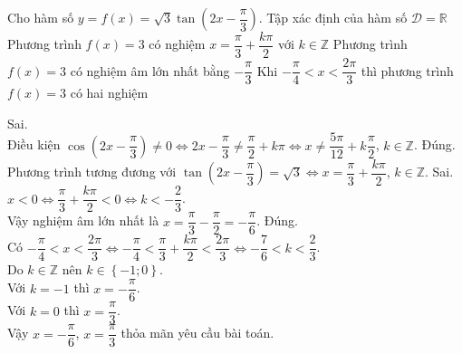 \begin{ex}%
	Cho hàm số $y=f(x)=\sqrt{3} \tan \left(2x-\dfrac{\pi}{3} \right)$.
	\choiceTF
	{Tập xác định của hàm số $\mathscr{D}=\mathbb{R}$}
	{\True Phương trình $f(x)=3$ có nghiệm $x=\dfrac{\pi}{3} + \dfrac{k\pi}{2}$ với $k \in \mathbb{Z}$}
	{Phương trình $f(x)=3$ có nghiệm âm lớn nhất bằng $-\dfrac{\pi}{3}$}
	{\True Khi $-\dfrac{\pi}{4} <x< \dfrac{2\pi}{3}$ thì phương trình $f(x)=3$ có hai nghiệm}
	\loigiai
	{
		\begin{itemchoice}
			\itemch Sai. \\
			Điều kiện
			$\cos \left(2x-\dfrac{\pi}{3} \right) \ne 0 \Leftrightarrow 2x-\dfrac{\pi}{3} \ne \dfrac{\pi}{2} + k\pi \Leftrightarrow x \ne \dfrac{5\pi}{12} + k\dfrac{\pi}{2}$, $k \in \mathbb{Z}$.
			\itemch Đúng. \\
			Phương trình tương đương với $\tan \left(2x-\dfrac{\pi}{3} \right) = \sqrt{3} \Leftrightarrow x=\dfrac{\pi}{3} + \dfrac{k\pi}{2}$, $k \in \mathbb{Z}$.
			\itemch Sai.\\
			$x <0 \Leftrightarrow \dfrac{\pi}{3} + \dfrac{k\pi}{2} <0 \Leftrightarrow k<-\dfrac{2}{3}$. \\
			Vậy nghiệm âm lớn nhất là $x=\dfrac{\pi}{3}-\dfrac{\pi}{2}=-\dfrac{\pi}{6}$.
			\itemch Đúng. \\
			Có  $-\dfrac{\pi}{4} <x< \dfrac{2\pi}{3} 
			\Leftrightarrow -\dfrac{\pi}{4} < \dfrac{\pi}{3} + \dfrac{k\pi}{2} < \dfrac{2\pi}{3}
			\Leftrightarrow -\dfrac{7}{6} <k< \dfrac{2}{3}$.\\
			Do $k \in \mathbb{Z}$ nên $k \in \left\{-1; 0 \right\}$.\\
			Với $k=-1$ thì $x=-\dfrac{\pi}{6}$.\\
			Với $k=0$ thì $x=\dfrac{\pi}{3}$.\\
			Vậy $x=-\dfrac{\pi}{6}$, $x=\dfrac{\pi}{3}$ thỏa mãn yêu cầu bài toán.
		\end{itemchoice}
	}
\end{ex}

